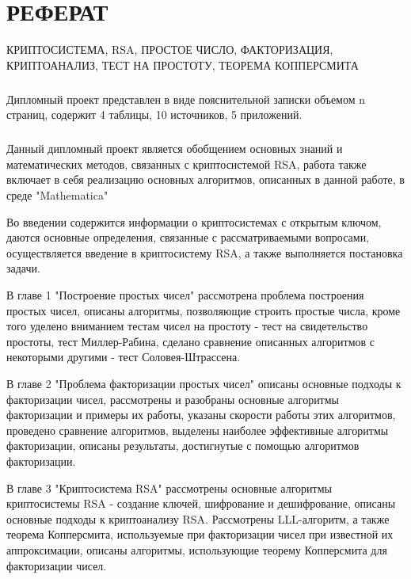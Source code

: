 
\newpage
\chapter*{РЕФЕРАТ}

КРИПТОСИСТЕМА, RSA, ПРОСТОЕ ЧИСЛО, ФАКТОРИЗАЦИЯ, КРИПТОАНАЛИЗ, ТЕСТ НА ПРОСТОТУ, ТЕОРЕМА КОППЕРСМИТА

\paragraph{} Дипломный проект представлен в виде пояснительной записки объемом n страниц, содержит 4 таблицы, 10 источников, 5 приложений.

\paragraph{} Данный дипломный проект является обобщением основных знаний и математических методов, связанных с криптосистемой RSA, работа также
	включает в себя реализацию основных алгоритмов, описанных в данной работе, в среде "Mathematica"

	Во введении содержится информации о криптосистемах с открытым ключом, даются основные определения, связанные с рассматриваемыми вопросами,
	осуществляется введение в криптосистему RSA, а также выполняется постановка задачи.

	В главе 1 "Построение простых чисел" рассмотрена проблема построения простых чисел, описаны алгоритмы, позволяющие строить простые числа, 
	кроме того уделено вниманием тестам чисел на простоту - тест на свидетельство простоты, тест Миллер-Рабина, сделано сравнение описанных алгоритмов
	с некоторыми другими - тест Соловея-Штрассена.

	В главе 2 "Проблема факторизации простых чисел" описаны основные подходы к факторизации чисел, рассмотрены и разобраны основные алгоритмы факторизации и примеры их работы, указаны скорости работы этих алгоритмов, проведено сравнение алгоритмов, выделены наиболее эффективные алгоритмы факторизации, описаны результаты, достигнутые с помощью алгоритмов факторизации.

	В главе 3 "Криптосистема RSA" рассмотрены основные алгоритмы криптосистемы RSA - создание ключей, шифрование и дешифрование, описаны основные
	подходы к криптоанализу RSA. Рассмотрены LLL-алгоритм, а также теорема Копперсмита, используемые при факторизации чисел при известной их 
	аппроксимации, описаны алгоритмы, использующие теорему Копперсмита для факторизации чисел.

\newpage

\newpage